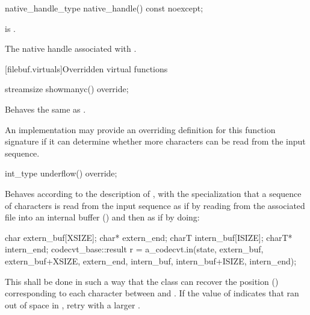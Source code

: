 %
\begin{itemdecl}
native_handle_type native_handle() const noexcept;
\end{itemdecl}

\begin{itemdescr}
\pnum
\expects
{} is .

\pnum
\returns
The native handle associated with .
\end{itemdescr}

[filebuf.virtuals]{Overridden virtual functions}

%
\begin{itemdecl}
streamsize showmanyc() override;
\end{itemdecl}

\begin{itemdescr}
\pnum
\effects
Behaves the same as
.
%

\pnum
\remarks
An
implementation may provide an overriding definition for this function
signature if it can determine whether more characters can be read from the input
sequence.
\end{itemdescr}

%
\begin{itemdecl}
int_type underflow() override;
\end{itemdecl}

\begin{itemdescr}
\pnum
\effects
Behaves according to the description of
,
with the specialization that a sequence of characters is read from the input
sequence as if by reading from the associated file
into an internal buffer ()
and then as if by doing:

\begin{codeblock}
char   extern_buf[XSIZE];
char*  extern_end;
charT  intern_buf[ISIZE];
charT* intern_end;
codecvt_base::result r =
  a_codecvt.in(state, extern_buf, extern_buf+XSIZE, extern_end,
               intern_buf, intern_buf+ISIZE, intern_end);
\end{codeblock}

This shall be done in such a way that the class can recover the
position
()
corresponding to each character between
and
.
If the value of
indicates that
ran out of space in
,
retry with a larger
.
\end{itemdescr}

